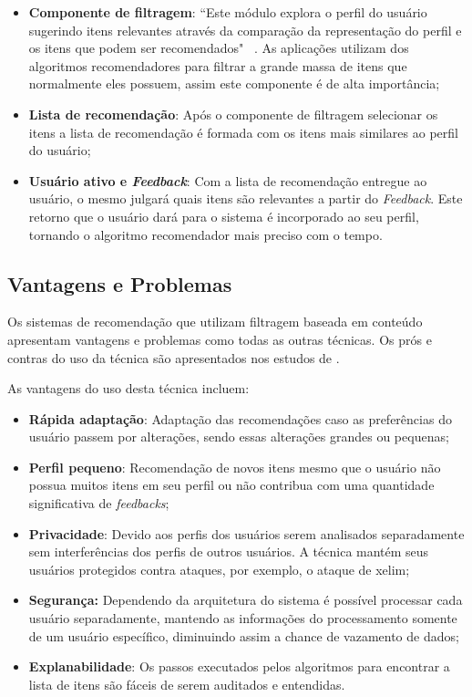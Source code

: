 \begin{itemize}
	\item{\textbf{Componente de filtragem}: ``Este módulo explora o perfil do usuário sugerindo itens relevantes através da comparação da representação do perfil e os itens que podem ser recomendados" ~\cite{Lops:2011}. As aplicações utilizam dos algoritmos recomendadores para filtrar a grande massa de itens que normalmente eles possuem, assim este componente é de alta importância;
	}
	
	\item{\textbf{Lista de recomendação}: Após o componente de filtragem selecionar os itens a lista de recomendação é formada com os itens mais similares ao perfil do usuário;
	}
	
	\item{\textbf{Usuário ativo e \textit{Feedback}}: Com a lista de recomendação entregue ao usuário, o mesmo julgará quais itens são relevantes a partir do \textit{Feedback}. Este retorno que o usuário dará para o sistema é incorporado ao seu perfil, tornando o algoritmo recomendador mais preciso com o tempo.
	}
\end{itemize}

\subsection{Vantagens e Problemas}
Os sistemas de recomendação que utilizam filtragem baseada em conteúdo apresentam vantagens e problemas como todas as outras técnicas. Os prós e contras do uso da técnica são apresentados nos estudos de .

As vantagens do uso desta técnica incluem:
\begin{itemize}
    \item \textbf{Rápida adaptação}: Adaptação das recomendações caso as preferências do usuário passem por alterações, sendo essas alterações grandes ou pequenas;
    
    \item \textbf{Perfil pequeno}: Recomendação de novos itens mesmo que o usuário não possua muitos itens em seu perfil ou não contribua com uma quantidade significativa de \textit{feedbacks};
    
    \item \textbf{Privacidade}: Devido aos perfis dos usuários serem analisados separadamente sem interferências dos perfis de outros usuários. A técnica mantém seus usuários protegidos contra ataques, por exemplo, o ataque de xelim;
    
    \item \textbf{Segurança:} Dependendo da arquitetura do sistema é possível processar cada usuário separadamente, mantendo as informações do processamento somente de um usuário específico, diminuindo assim a chance de vazamento de dados;
    
    \item \textbf{Explanabilidade}: Os passos executados pelos algoritmos para encontrar a lista de itens são fáceis de serem auditados e entendidas.
\end{itemize}

